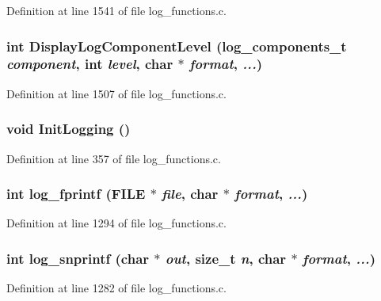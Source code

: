 Definition at line 1541 of file log\_\-functions.c.
\subsubsection[{DisplayLogComponentLevel}]{\setlength{\rightskip}{0pt plus 5cm}int DisplayLogComponentLevel (log\_\-components\_\-t {\em component}, \/  int {\em level}, \/  char $\ast$ {\em format}, \/   {\em ...})}\label{log__functions_8c_ac7b85ecca0ee83b93686c445cca9f77d}


Definition at line 1507 of file log\_\-functions.c.
\subsubsection[{InitLogging}]{\setlength{\rightskip}{0pt plus 5cm}void InitLogging ()}\label{log__functions_8c_a9c6fd2b1fc6d60ab2f80b2799b0fa81e}


Definition at line 357 of file log\_\-functions.c.
\subsubsection[{log\_\-fprintf}]{\setlength{\rightskip}{0pt plus 5cm}int log\_\-fprintf (FILE $\ast$ {\em file}, \/  char $\ast$ {\em format}, \/   {\em ...})}\label{log__functions_8c_a3b87e5d817c164ef1dc8fee8974aaf5e}


Definition at line 1294 of file log\_\-functions.c.
\subsubsection[{log\_\-snprintf}]{\setlength{\rightskip}{0pt plus 5cm}int log\_\-snprintf (char $\ast$ {\em out}, \/  size\_\-t {\em n}, \/  char $\ast$ {\em format}, \/   {\em ...})}\label{log__functions_8c_a255a6aeacda1e202d9066e2da937c3e7}


Definition at line 1282 of file log\_\-functions.c.
